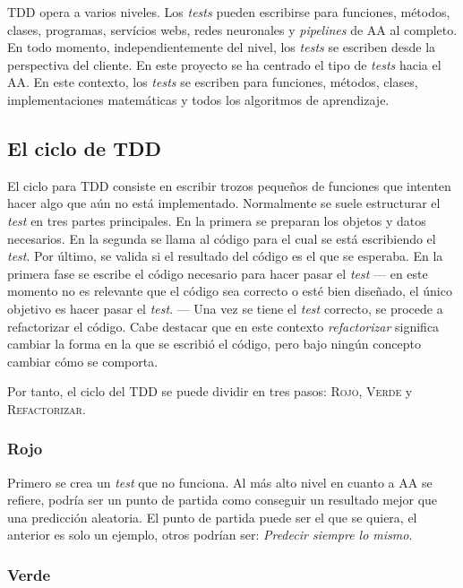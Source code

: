 \ac{TDD} opera a varios niveles. Los \emph{tests} pueden escribirse para
funciones, métodos, clases, programas, servícios webs, redes neuronales y
\emph{pipelines} de \ac{AA} al completo. En todo momento, independientemente del
nivel, los \emph{tests} se escriben desde la perspectiva del cliente. En este
proyecto se ha centrado el tipo de \emph{tests} hacia el \ac{AA}. En este
contexto, los \emph{tests} se escriben para funciones, métodos, clases,
implementaciones matemáticas y todos los algoritmos de aprendizaje.

\subsection{El ciclo de \ac{TDD}}
\label{subsec:tddcycle}

El ciclo para \ac{TDD} consiste en escribir trozos pequeños de funciones que
intenten hacer algo que aún no está implementado. Normalmente se suele
estructurar el \emph{test} en tres partes principales. En la primera se preparan
los objetos y datos necesarios. En la segunda se llama al código para el cual se
está escribiendo el \emph{test}. Por último, se valida si el resultado del
código es el que se esperaba. En la primera fase se escribe el código
necesario para hacer pasar el \emph{test} --- en este momento no es relevante
que el código sea correcto o esté bien diseñado, el único objetivo es hacer
pasar el \emph{test}. --- Una vez se tiene el \emph{test} correcto, se procede a
refactorizar el código. Cabe destacar que en este contexto \emph{refactorizar}
significa cambiar la forma en la que se escribió el código, pero bajo ningún
concepto cambiar cómo se comporta.

Por tanto, el ciclo del \ac{TDD} se puede dividir en tres pasos: \textsc{Rojo},
\textsc{Verde} y \textsc{Refactorizar}.

\subsubsection{Rojo}
\label{sec:tddred}

Primero se crea un \emph{test} que no funciona. Al más alto nivel en cuanto a
\ac{AA} se refiere, podría ser un punto de partida como conseguir un resultado
mejor que una predicción aleatoria. El punto de partida puede ser el que se
quiera, el anterior es solo un ejemplo, otros podrían ser: \emph{Predecir
  siempre lo mismo}.

\subsubsection{Verde}
\label{sec:tddgreen}

